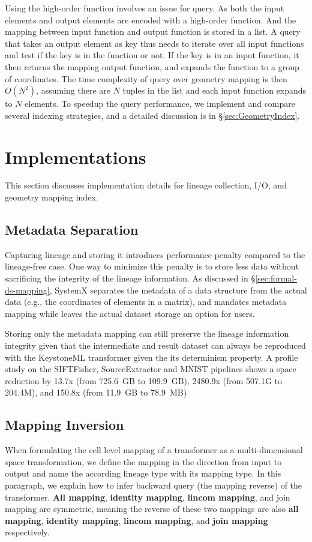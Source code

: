 \documentclass{sig-alternate}
\begin{document}
Using the high-order function involves an issue for query. 
As both the input elements and output elements are encoded with a high-order function. 
And the mapping between input function and output function is stored in a list. 
A query that takes an output element as key thus needs to iterate over all input functions and test if the key is in the function or not.
If the key is in an input function, it then returns the mapping output function, and expands the function to a group of coordinates.
The time complexity of query over geometry mapping is then $O(N^2)$, assuming there are $N$ tuples in the list and each input function expands to $N$ elements.
To speedup the query performance, we implement and compare several indexing strategies, and a detailed discussion is in \S\ref{sec:GeometryIndex}.


\section{Implementations}
\label{sec:Impl}

This section discusses implementation details for lineage collection, I/O, and geometry mapping index.

\subsection{Metadata Separation}
Capturing lineage and storing it introduces performance penalty compared to the lineage-free case. 
One way to minimize this penalty is to store less data without sacrificing the integrity of the lineage information.
As discussed in \S\ref{sec:formal-ds-mapping}, SystemX separates the metadata of a data structure from the 
actual data (e.g., the coordinates of elements in a matrix), and mandates metadata mapping while leaves
the actual dataset storage an option for users.

Storing only the metadata mapping can still preserve the lineage information integrity given that the intermediate and result 
dataset can always be reproduced with the KeystoneML transformer given the its determinism property. 
A profile study on the SIFTFisher, SourceExtractor and MNIST pipelines shows a space reduction by 
13.7x (from 725.6~GB to 109.9~GB), 2480.9x (from 507.1G to 204.4M), and 150.8x (from 11.9~GB to 78.9~MB)

\subsection{Mapping Inversion}
When formulating the cell level mapping of a transformer as a multi-dimensional space transformation, we define
the mapping in the direction from input to output and name the according lineage type with its mapping type.
In this paragraph, we explain how to infer backward query (the mapping reverse) of the transformer.
{\bf All mapping}, {\bf identity mapping}, {\bf lincom mapping}, and {join mapping} are symmetric, 
meaning the reverse of these two mappings are also {\bf all mapping}, {\bf identity mapping}, 
{\bf lincom mapping}, and {\bf join mapping} respectively.
\end{document}
